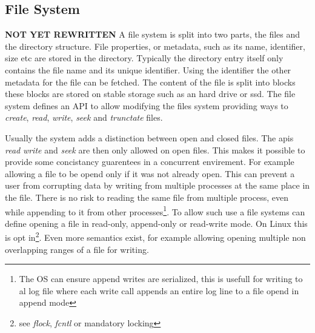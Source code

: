 \subsection{File System}
\textbf{NOT YET REWRITTEN}
A file system is split into two parts, the files and the directory structure. File properties, or metadata, such as its name, identifier, size etc are stored in the directory. Typically the directory entry itself only contains the file name and its unique identifier. Using the identifier the other metadata for the file can be fetched. The content of the file is split into blocks these blocks are stored on stable storage such as an hard drive or ssd. The file system defines an API to allow modifying the files system providing ways to \textit{create}, \textit{read}, \textit{write}, \textit{seek} and \textit{trunctate} files. 

Usually the system adds a distinction between open and closed files. The apis \textit{read} \textit{write} and \textit{seek} are then only allowed on open files. This makes it possible to provide some concistancy guarentees in a concurrent envirement. For example allowing a file to be opend only if it was not already open. This can prevent a user from corrupting data by writing from multiple processes at the same place in the file. There is no risk to reading the same file from multiple process, even while appending to it from other processes\footnote{The OS can ensure append writes are serialized, this is usefull for writing to al log file where each write call appends an entire log line to a file opend in append mode}. To allow such use a file systems can define opening a file in read-only, append-only or read-write mode. On Linux this is opt in\footnote{see \textsl{flock}, \textsl{fcntl} or mandatory locking}. Even more semantics exist, for example allowing opening multiple non overlapping ranges of a file for writing. 

